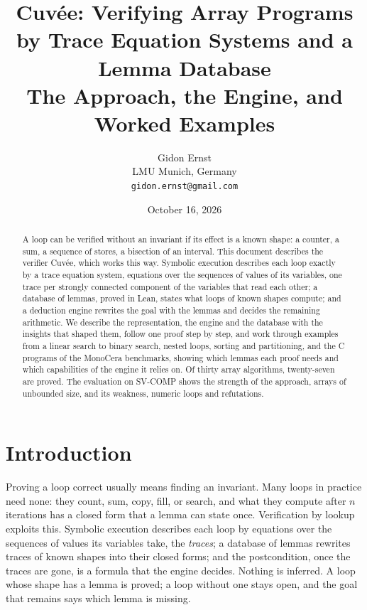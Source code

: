 \documentclass[11pt,a4paper]{article}
\title{Cuvée: Verifying Array Programs by Trace Equation Systems and a Lemma Database\\[4pt]
\large The Approach, the Engine, and Worked Examples}
\author{Gidon Ernst\\[2pt] \small LMU Munich, Germany\\ \small\texttt{gidon.ernst@gmail.com}}
\date{October 16, 2026}
\begin{document}
\maketitle

\begin{abstract}
A loop can be verified without an invariant if its effect is a known shape: a counter, a sum, a sequence of stores, a
bisection of an interval. This document describes the verifier Cuvée, which works this way. Symbolic execution
describes each loop exactly by a trace equation system, equations over the sequences of values of its variables, one
trace per strongly connected component of the variables that read each other; a database of lemmas, proved in Lean,
states what loops of known shapes compute; and a deduction engine rewrites the goal with the lemmas and decides the
remaining arithmetic. We describe the representation, the engine and the database with the insights that shaped them,
follow one proof step by step, and work through examples from a linear search to binary search, nested loops,
sorting and partitioning, and the C programs of the MonoCera benchmarks, showing which lemmas each proof needs and
which capabilities of the engine it relies on. Of thirty array algorithms, twenty-seven are proved. The evaluation
on SV-COMP shows the strength of the approach, arrays of unbounded size, and its weakness, numeric loops and
refutations.
\end{abstract}

\section{Introduction}
Proving a loop correct usually means finding an invariant. Many loops in practice need none: they count, sum, copy,
fill, or search, and what they compute after $n$ iterations has a closed form that a lemma can state once. Verification
by lookup exploits this. Symbolic execution describes each loop by equations over the sequences of values its variables
take, the \emph{traces}; a database of lemmas rewrites traces of known shapes into their closed forms; and the
postcondition, once the traces are gone, is a formula that the engine decides. Nothing is inferred. A loop whose shape
has a lemma is proved; a loop without one stays open, and the goal that remains says which lemma is
missing.
\end{document}
